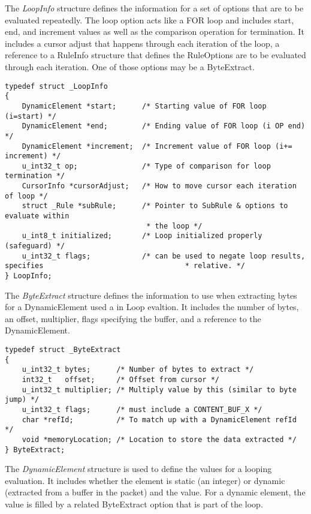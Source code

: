 \documentclass[english]{report}
\begin{document}
\begin{itemize}
The {\em LoopInfo} structure defines the information for a set of options that
are to be evaluated repeatedly.  The loop option acts like a FOR loop and
includes start, end, and increment values as well as the comparison operation
for termination.  It includes a cursor adjust that happens through each
iteration of the loop, a reference to a RuleInfo structure that defines the
RuleOptions are to be evaluated through each iteration.  One of those options
may be a ByteExtract.

\begin{verbatim}
typedef struct _LoopInfo
{
    DynamicElement *start;      /* Starting value of FOR loop (i=start) */
    DynamicElement *end;        /* Ending value of FOR loop (i OP end) */
    DynamicElement *increment;  /* Increment value of FOR loop (i+= increment) */
    u_int32_t op;               /* Type of comparison for loop termination */
    CursorInfo *cursorAdjust;   /* How to move cursor each iteration of loop */
    struct _Rule *subRule;      /* Pointer to SubRule & options to evaluate within
                                 * the loop */
    u_int8_t initialized;       /* Loop initialized properly (safeguard) */
    u_int32_t flags;            /* can be used to negate loop results, specifies                                 * relative. */
} LoopInfo;
\end{verbatim}

The {\em ByteExtract} structure defines the information to use when extracting
bytes for a DynamicElement used a in Loop evaltion.  It includes the number of
bytes, an offset, multiplier, flags specifying the buffer, and a reference to
the DynamicElement.

\begin{verbatim}
typedef struct _ByteExtract
{
    u_int32_t bytes;      /* Number of bytes to extract */
    int32_t   offset;     /* Offset from cursor */
    u_int32_t multiplier; /* Multiply value by this (similar to byte jump) */
    u_int32_t flags;      /* must include a CONTENT_BUF_X */
    char *refId;          /* To match up with a DynamicElement refId */
    void *memoryLocation; /* Location to store the data extracted */
} ByteExtract;
\end{verbatim}

The {\em DynamicElement} structure is used to define the values for a looping
evaluation.  It includes whether the element is static (an integer) or dynamic
(extracted from a buffer in the packet) and the value.  For a dynamic element,
the value is filled by a related ByteExtract option that is part of the loop.


\end{itemize}
\end{document}
